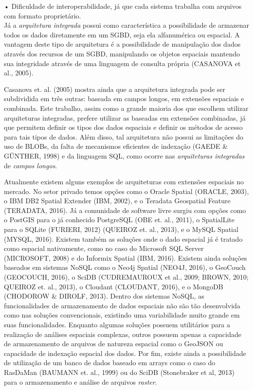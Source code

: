 			•	Dificuldade de interoperabilidade, já que cada sistema trabalha
						com arquivos com formato proprietário. \\
						
		
		Já a \textit{arquitetura integrada} possui como característica a possibilidade de armazenar todos os dados diretamente em um SGBD, seja ela alfanumérica ou espacial. A vantagem deste tipo de arquitetura é a possibilidade de manipulação dos dados através dos recursos de um SGBD, manipulando os objetos espaciais mantendo sua integridade através de uma linguagem de consulta própria (CASANOVA et al., 2005).
		
		Casanova et. al. (2005) mostra ainda que a arquitetura integrada pode ser subdividida em três outras: baseada em campos longos, em extensões espaciais e combinada. Este trabalho, assim como a grande maioria dos que escolhem utilizar arquiteturas integradas, prefere utilizar as baseadas em extensões combinadas, já que permitem definir os tipos dos dados espaciais e definir os métodos de acesso para tais tipos de dados. Além disso, tal arquitetura não possui as limitações do uso de BLOBs, da falta de mecanismos eficientes de indexação (GAEDE \& GÜNTHER, 1998) e da linguagem SQL, como ocorre nas \textit{arquiteturas integradas} de \textit{campos longos}.
		
		Atualmente existem alguns exemplos de arquiteturas com extensões espaciais no mercado. No setor privado temos opções como o Oracle Spatial (ORACLE, 2003), o IBM DB2 Spatial Extender (IBM, 2002), e o Teradata Geospatial Feature (TERADATA, 2016). Já a comunidade de software livre surgiu com opções como o PostGIS para o já conhecido PostgreSQL (OBE et. al., 2011), o SpatialLite para o SQLite (FURIERI, 2012) (QUEIROZ et. al., 2013), e o MySQL Spatial (MYSQL, 2016). Existem também as soluções onde o dado espacial já é tratado como espacial nativamente, como no caso do Microsoft SQL Server (MICROSOFT, 2008) e do Informix Spatial (IBM, 2016). Existem ainda soluções baseados em sistemas NoSQL como o Neo4j Spatial (NEO4J, 2016), o GeoCouch (GEOCOUCH, 2016), o SciDB (CUDREMAUROUX et al., 2009; BROWN, 2010; QUEIROZ et. al., 2013), o Cloudant (CLOUDANT, 2016), e o MongoDB (CHODOROW \& DIROLF, 2013). Dentro dos sistemas NoSQL, as funcionalidades de armazenamento de dados espaciais não são tão desenvolvida como nas soluções convencionais, existindo uma variabilidade muito grande em suas funcionalidades. Enquanto algumas soluções possuem utilitários para a realização de análises espaciais complexas, outros possuem apenas a capacidade de armazenamento de arquivos de natureza espacial como o GeoJSON ou capacidade de indexação espacial dos dados. Por fim, existe ainda a possibilidade de utilização de um banco de dados baseado em arrays como o caso do RasDaMan (BAUMANN et. al., 1999) ou do SciDB (Stonebraker et al, 2013) para o armazenamento e análise de arquivos\textit{ raster}.
		
